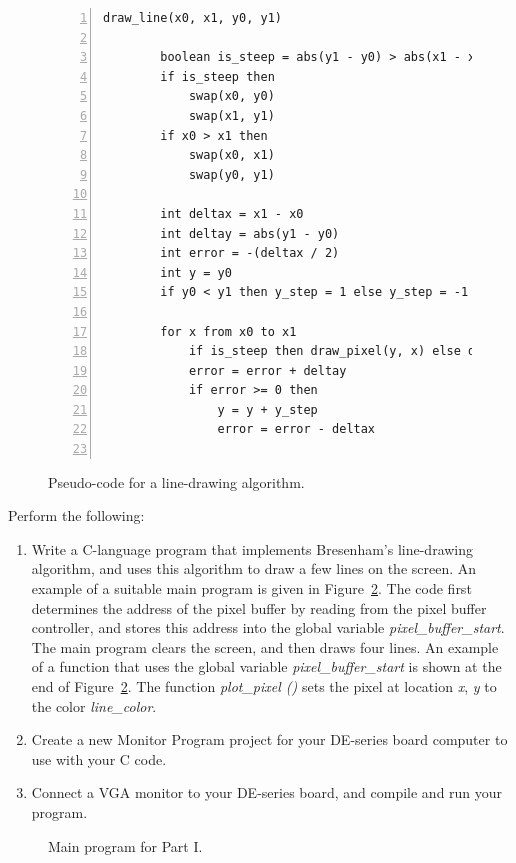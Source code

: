 \documentclass[epsfig,10pt,fullpage]{article}
\begin{document}
\begin{figure}[th]
	\centering
		\begin{lstlisting}[numbers=left, stepnumber=1, xleftmargin=1cm]
  draw_line(x0, x1, y0, y1)
		
		boolean is_steep = abs(y1 - y0) > abs(x1 - x0)
		if is_steep then
			swap(x0, y0)
			swap(x1, y1)
		if x0 > x1 then
			swap(x0, x1)
			swap(y0, y1)
			
		int deltax = x1 - x0
		int deltay = abs(y1 - y0)
		int error = -(deltax / 2)
		int y = y0
		if y0 < y1 then y_step = 1 else y_step = -1
		
		for x from x0 to x1
			if is_steep then draw_pixel(y, x) else draw_pixel(x, y)
			error = error + deltay
			if error >= 0 then
				y = y + y_step
				error = error - deltax
			
\end{lstlisting}
	\caption{Pseudo-code for a line-drawing algorithm.}
	\label{fig:line_algorithm}
\end{figure}

Perform the following:

\begin{enumerate}

\item Write a C-language program that implements Bresenham's line-drawing algorithm,
and uses this algorithm to draw a few lines on the screen.  An example of a suitable main 
program is given in Figure~\ref{fig:main1}. The code first determines the address of the 
pixel buffer by reading from the pixel buffer controller, and stores this address into the
global variable {\it pixel\_buffer\_start}. The main program clears the screen, and then 
draws four lines.  An example of a function that uses the global variable 
{\it pixel\_buffer\_start} is shown at the end of Figure~\ref{fig:main1}. The function 
{\it plot\_pixel ()} sets the pixel at location {\it x}, {\it y} to the color {\it line\_color}. 

\item Create a new Monitor Program project for your DE-series board computer to use with your C code.

\item Connect a VGA monitor to your DE-series board, and compile and run your program.
\end{enumerate}

\begin{figure}[th]
\centering

\caption{Main program for Part I.}
\label{fig:main1}
\end{figure}
\end{document}
